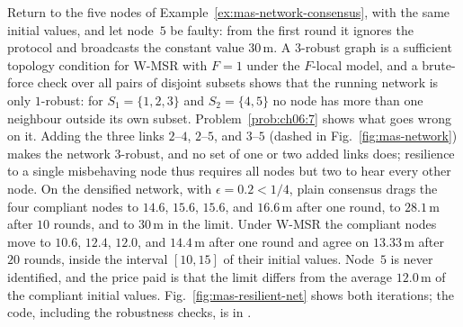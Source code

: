 \begin{example}
\label{ex:mas-resilient-net}
Return to the five nodes of Example~\ref{ex:mas-network-consensus}, with the same initial values, and let node~$5$ be faulty: from the first round it ignores the protocol and broadcasts the constant value $30$\,m. A $3$-robust graph is a sufficient topology condition for W-MSR with $F=1$ under the $F$-local model, and a brute-force check over all pairs of disjoint subsets shows that the running network is only $1$-robust: for $S_1=\{1,2,3\}$ and $S_2=\{4,5\}$ no node has more than one neighbour outside its own subset. Problem~\ref{prob:ch06:7} shows what goes wrong on it. Adding the three links $2$--$4$, $2$--$5$, and $3$--$5$ (dashed in Fig.~\ref{fig:mas-network}) makes the network $3$-robust, and no set of one or two added links does; resilience to a single misbehaving node thus requires all nodes but two to hear every other node. On the densified network, with $\epsilon=0.2<1/4$, plain consensus drags the four compliant nodes to $14.6$, $15.6$, $15.6$, and $16.6$\,m after one round, to $28.1$\,m after $10$ rounds, and to $30$\,m in the limit. Under W-MSR the compliant nodes move to $10.6$, $12.4$, $12.0$, and $14.4$\,m after one round and agree on $13.33$\,m after $20$ rounds, inside the interval $[10,15]$ of their initial values. Node~$5$ is never identified, and the price paid is that the limit differs from the average $12.0$\,m of the compliant initial values. Fig.~\ref{fig:mas-resilient-net} shows both iterations; the code, including the robustness checks, is in .
\end{example}


